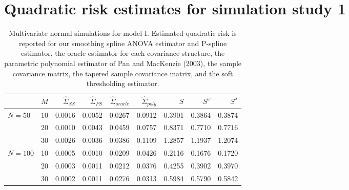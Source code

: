\section{Quadratic risk estimates for simulation study 1}
%
\begin{table}[H]
\centering
\caption{Multivariate normal simulations for model I. Estimated quadratic risk is reported for our smoothing spline ANOVA estimator and P-spline estimator, the oracle estimator for each covariance structure, the parametric polynomial estimator of Pan and MacKenzie (2003), the sample covariance matrix, the tapered sample covariance matrix,
                                    and the soft thresholding estimator.}
\begin{tabular}{lrrrrrrrr}
& $M$ &$\hat{\Sigma}_{SS}$& $\hat{\Sigma}_{PS}$ &$\hat{\Sigma}_{oracle}$& $\hat{\Sigma}_{poly}$ & $S$ &$S^\omega$& $S^\lambda$ \\ 
  \hline
  $N = 50$ & $10$ & 0.0016 & 0.0052 & 0.0267 & 0.0912 & 0.3901 & 0.3864 & 0.3874 \\ 
   		& $20$ & 0.0010 & 0.0043 & 0.0459 & 0.0757 & 0.8371 & 0.7710 & 0.7716 \\ 
   		& $30$ & 0.0026 & 0.0036 & 0.0386 & 0.1109 & 1.2857 & 1.1937 & 1.2074 \\ 
 $N = 100$ & 10 & 0.0005 & 0.0010 & 0.0209 & 0.0426 & 0.2116 & 0.1676 & 0.1720 \\ 
    		&   $20$ & 0.0003 & 0.0011 & 0.0212 & 0.0376 & 0.4255 & 0.3902 & 0.3970 \\ 
    		&   $30$ & 0.0002 & 0.0011 & 0.0276 & 0.0313 & 0.5984 & 0.5790 & 0.5842 \\ 
   \hline
\end{tabular} 
\label{table:simulation-1-quad-loss-sigma-1}
\end{table}
